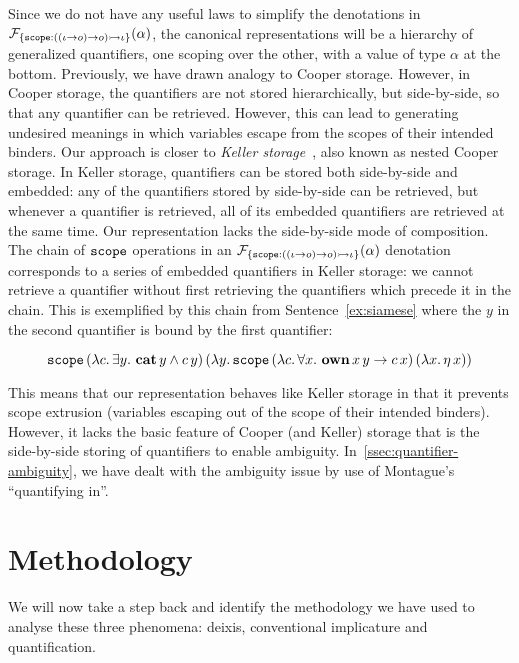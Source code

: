 Since we do not have any useful laws to simplify the denotations in
$\mathcal{F}_{\{ \mathtt{scope} : ((\iota \to o) \to o) \rightarrowtail \iota \}}(\alpha)$, the
canonical representations will be a hierarchy of generalized quantifiers,
one scoping over the other, with a value of type $\alpha$ at the
bottom. Previously, we have drawn analogy to Cooper storage. However, in
Cooper storage, the quantifiers are not stored hierarchically, but
side-by-side, so that any quantifier can be retrieved. However, this can
lead to generating undesired meanings in which variables escape from the
scopes of their intended binders. Our approach is closer to \emph{Keller
  storage}~\cite{keller1988nested}, also known as nested Cooper storage. In
Keller storage, quantifiers can be stored both side-by-side and embedded:
any of the quantifiers stored by side-by-side can be retrieved, but
whenever a quantifier is retrieved, all of its embedded quantifiers are
retrieved at the same time. Our representation lacks the side-by-side mode
of composition. The chain of $\mathtt{scope}$ operations in an
$\mathcal{F}_{\{ \mathtt{scope} : ((\iota \to o) \to o) \rightarrowtail \iota \}}(\alpha)$
denotation corresponds to a series of embedded quantifiers in Keller
storage: we cannot retrieve a quantifier without first retrieving the
quantifiers which precede it in the chain. This is exemplified by this
chain from Sentence~\ref{ex:siamese} where the $y$ in the second quantifier
is bound by the first quantifier:

$$
\app{\op{scope}}{(\lam{c}{\exists y.\ \ap{\obj{cat}}{y} \land \ap{c}{y}})}
{(\lam{y}{\app{\op{scope}}{(\lam{c}{\forall x.\ \app{\obj{own}}{x}{y} \to \ap{c}{x}})}
{(\lam{x}{\etaE{x}})}})}
$$

This means that our representation behaves like Keller storage in that it
prevents scope extrusion (variables escaping out of the scope of their
intended binders). However, it lacks the basic feature of Cooper (and
Keller) storage that is the side-by-side storing of quantifiers to enable
ambiguity. In~\ref{ssec:quantifier-ambiguity}, we have dealt with the
ambiguity issue by use of Montague's ``quantifying in''.


\section{Methodology}
\label{sec:methodology}

We will now take a step back and identify the methodology we have used to
analyse these three phenomena: deixis, conventional implicature and
quantification.

